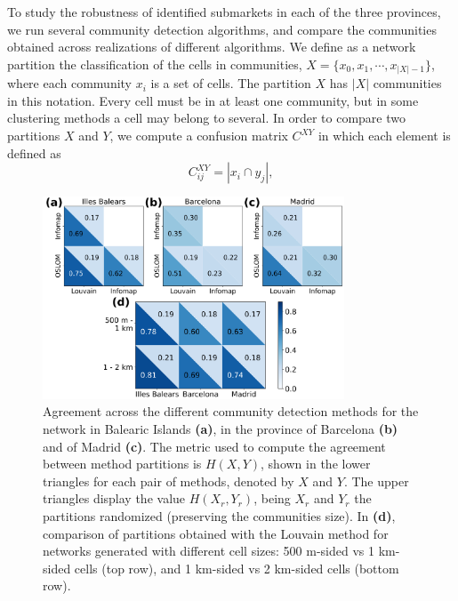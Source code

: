 To study the robustness of identified submarkets in each of the three provinces, we run several community detection algorithms, and compare the communities obtained across realizations of different algorithms. We define as a network partition the classification of the cells in communities, $X = \{x_0, x_1, \cdots , x_{|X|-1} \}$, where each community $x_i$ is a set of cells. The partition $X$ has $|X|$ communities in this notation. Every cell must be in at least one community, but in some clustering methods a cell may belong to several.
In order to compare two partitions $X$ and $Y$, we compute a confusion matrix $C^{XY}$ in which each element is defined as
\begin{equation}
    C^{XY}_{ij} = | x_i \cap y_j | ,
\end{equation}
\begin{figure}[ht]
    \centering
    \includegraphics[width = 0.8\textwidth]{Figs/Idealista_segmentation/Agreement_method_scale.pdf}
	\caption[Agreement across three methods and cell sizes.]{ Agreement across the different community detection methods for the network in Balearic Islands \textbf{(a)}, in the province of Barcelona \textbf{(b)} and of Madrid \textbf{(c)}. The metric used to compute the agreement between method partitions is $H(X,Y)$, shown in the lower triangles for each pair of methods, denoted by $X$ and $Y$. The upper triangles display the value $H(X_r,Y_r)$, being $X_r$ and $Y_r$ the partitions randomized (preserving the communities size). In \textbf{(d)}, comparison of partitions obtained with the Louvain method for networks generated with different cell sizes: 500 m-sided vs  1 km-sided cells (top row), and 1 km-sided vs 2 km-sided cells (bottom row). \label{fig:agreement_scale_method}}
\end{figure}
